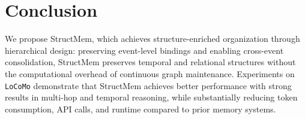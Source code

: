 \section{Conclusion}
We propose StructMem, which achieves structure-enriched organization through hierarchical design: preserving event-level bindings and enabling cross-event consolidation, StructMem preserves temporal and relational structures without the computational overhead of continuous graph maintenance. Experiments on \texttt{LoCoMo} demonstrate that StructMem achieves better performance with strong results in multi-hop and temporal reasoning, while substantially reducing token consumption, API calls, and runtime compared to prior memory systems.
